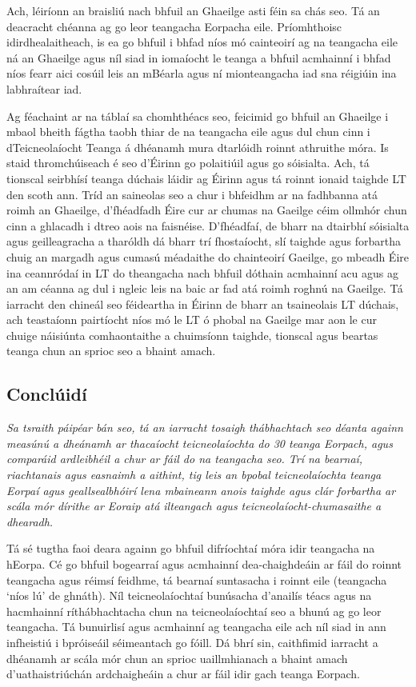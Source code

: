 \documentclass[]{../../metanetpaper}
\begin{document}
\begin{multicols}{2}
Ach, léiríonn an braisliú nach bhfuil an Ghaeilge asti féin sa chás seo. Tá an deacracht chéanna ag go leor teangacha Eorpacha eile. Príomhthoisc idirdhealaitheach, is ea go bhfuil i bhfad níos mó cainteoirí ag na teangacha eile ná an Ghaeilge agus níl siad in iomaíocht le teanga a bhfuil acmhainní i bhfad níos fearr aici cosúil leis an mBéarla agus ní mionteangacha iad sna réigiúin ina labhraítear iad.

Ag féachaint ar na táblaí sa chomhthéacs seo, feicimid go bhfuil an Ghaeilge i mbaol bheith fágtha taobh thiar de na teangacha eile agus dul chun cinn i dTeicneolaíocht Teanga á dhéanamh mura dtarlóidh roinnt athruithe móra. Is staid thromchúiseach é seo d’Éirinn go polaitiúil agus go sóisialta. Ach, tá tionscal seirbhísí teanga dúchais láidir ag Éirinn agus tá roinnt ionaid taighde LT den scoth ann. Tríd an saineolas seo a chur i bhfeidhm ar na fadhbanna atá roimh an Ghaeilge, d’fhéadfadh Éire cur ar chumas na Gaeilge céim ollmhór chun cinn a ghlacadh i dtreo aois na faisnéise. D’fhéadfaí, de bharr na dtairbhí sóisialta agus geilleagracha a tharóldh dá bharr trí fhostaíocht, slí taighde agus forbartha chuig an margadh agus cumasú méadaithe do chainteoirí Gaeilge, go mbeadh Éire ina ceannródaí in LT do theangacha nach bhfuil dóthain acmhainní acu agus ag an am céanna ag dul i ngleic leis na baic ar fad atá roimh roghnú na Gaeilge. Tá iarracht den chineál seo féideartha in Éirinn de bharr an tsaineolais LT dúchais, ach teastaíonn pairtíocht níos mó le LT ó phobal na Gaeilge mar aon le cur chuige náisiúnta comhaontaithe a chuimsíonn taighde, tionscal agus beartas teanga chun an sprioc seo a bhaint amach.


\subsection{Conclúidí}

\emph{Sa tsraith páipéar bán seo, tá an iarracht tosaigh thábhachtach seo déanta againn measúnú a dheánamh ar thacaíocht teicneolaíochta do 30 teanga Eorpach, agus comparáid ardleibhéil a chur ar fáil do na teangacha seo. Trí na bearnaí, riachtanais agus easnaimh a aithint, tig leis an bpobal teicneolaíochta teanga Eorpaí agus geallsealbhóirí lena mbaineann anois taighde agus clár forbartha ar scála mór dírithe ar Eoraip atá ilteangach agus teicneolaíocht-chumasaithe a dhearadh.}

Tá sé tugtha faoi deara againn go bhfuil difríochtaí móra idir teangacha na hEorpa. Cé go bhfuil bogearraí agus acmhainní dea-chaighdeáin ar fáil do roinnt teangacha agus réimsí feidhme, tá bearnaí suntasacha i roinnt eile (teangacha `níos lú' de ghnáth). Níl teicneolaíochtaí bunúsacha d’anailís téacs agus na hacmhainní ríthábhachtacha chun na teicneolaíochtaí seo a bhunú ag go leor teangacha. Tá bunuirlisí agus acmhainní ag teangacha eile ach níl siad in ann infheistiú i bpróiseáil séimeantach go fóill. Dá bhrí sin, caithfimid iarracht a dhéanamh ar scála mór chun an sprioc uaillmhianach a bhaint amach d’uathaistriúchán ardchaigheáin a chur ar fáil idir gach teanga Eorpach.


\end{multicols}
\end{document}
